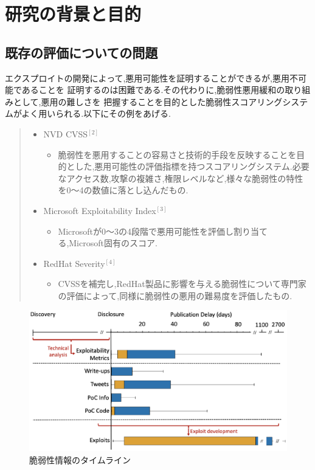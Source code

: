 \documentclass[submit,techreq,noauthor]{eco}	%
\begin{document}
\section{研究の背景と目的}

\subsection*{既存の評価についての問題}
エクスプロイトの開発によって,悪用可能性を証明することができるが,悪用不可能であることを
証明するのは困難である.その代わりに,脆弱性悪用緩和の取り組みとして,悪用の難しさを
把握することを目的とした脆弱性スコアリングシステムがよく用いられる.以下にその例をあげる.
\begin{quote}
  \begin{itemize}
   \item NVD CVSS\begin{math}^{[2]}\end{math}
    \begin{itemize}
      \item 脆弱性を悪用することの容易さと技術的手段を反映することを目的とした,悪用可能性の評価指標を持つスコアリングシステム.必要なアクセス数,攻撃の複雑さ,権限レベルなど,様々な脆弱性の特性を0〜4の数値に落とし込んだもの.
    \end{itemize}
   \item Microsoft Exploitability Index\begin{math}^{[3]}\end{math}
    \begin{itemize}
      \item Microsoftが0〜3の4段階で悪用可能性を評価し割り当てる,Microsoft固有のスコア.
    \end{itemize}
   \item RedHat Severity\begin{math}^{[4]}\end{math}
    \begin{itemize}
      \item CVSSを補完し,RedHat製品に影響を与える脆弱性について専門家の評価によって,同様に脆弱性の悪用の難易度を評価したもの.
    \end{itemize}
  \end{itemize}
\end{quote}

\begin{figure}[H]
  \centering
  \includegraphics[scale=0.4]{fig/pic1.eps}
  \caption{脆弱性情報のタイムライン}
\end{figure}
\end{document}
